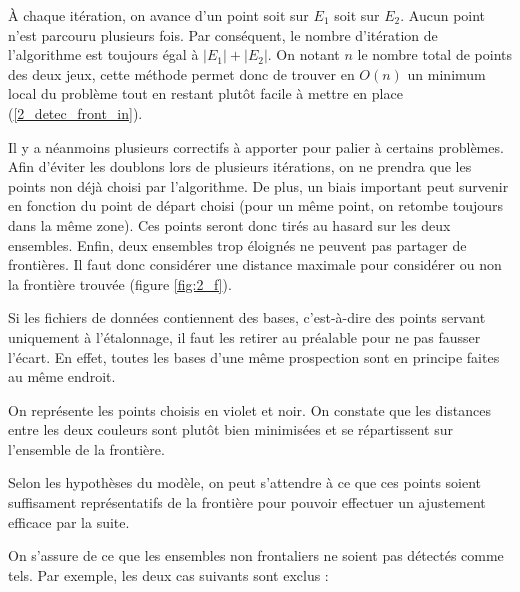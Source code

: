 \documentclass[12pt]{article}
\begin{document}
    À chaque itération, on avance d'un point soit sur $E_1$ soit sur $E_2$. Aucun point n'est parcouru plusieurs fois. Par conséquent, le nombre d'itération de l'algorithme est toujours égal à $|E_1| + |E_2|$. On notant $n$ le nombre total de points des deux jeux, cette méthode permet donc de trouver en $O(n)$ un minimum local du problème tout en restant plutôt facile à mettre en place \label{2_detec_front_out} (\ref{2_detec_front_in}).
    
    Il y a néanmoins plusieurs correctifs à apporter pour palier à certains problèmes. Afin 
    d'éviter les doublons lors de plusieurs itérations, on ne prendra que les points non déjà choisi par l'algorithme. De plus, un biais important peut survenir en fonction du point de départ choisi (pour un même point, on retombe toujours dans la même zone). Ces points seront donc tirés au hasard sur les deux ensembles. Enfin, deux ensembles trop éloignés ne peuvent pas partager de frontières. Il faut donc considérer une distance maximale pour considérer ou non la frontière trouvée (figure \ref{fig:2_f}).

    Si les fichiers de données contiennent des bases, c'est-à-dire des points servant uniquement à l'étalonnage, il faut les retirer au préalable pour ne pas fausser l'écart. En effet, toutes les bases d'une même prospection sont en principe faites au même endroit.
    
    On représente les points choisis en violet et noir. On constate que les distances entre les deux couleurs sont plutôt bien minimisées et se répartissent sur l'ensemble de la frontière.
    
    Selon les hypothèses du modèle, on peut s'attendre à ce que ces points soient suffisament représentatifs de la frontière pour pouvoir effectuer un ajustement efficace par la suite.

    On s'assure de ce que les ensembles non frontaliers ne soient pas détectés comme tels. Par exemple, les deux cas suivants sont exclus :
\end{document}
